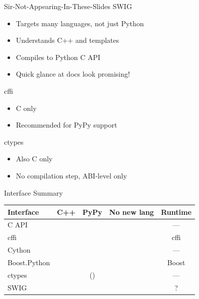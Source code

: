 \documentclass{beamer}
\begin{document}
\begin{frame}{Sir-Not-Appearing-In-These-Slides}
  SWIG
  \begin{itemize}
    \item Targets many languages, not just Python
    \item Understands C++ and templates
    \item Compiles to Python C API
    \item Quick glance at docs look promising!
  \end{itemize}
  cffi
  \begin{itemize}
    \item C only
    \item Recommended for PyPy support
  \end{itemize}
  ctypes
  \begin{itemize}
    \item Also C only
    \item No compilation step, ABI-level only
  \end{itemize}
\end{frame}

\begin{frame}{Interface Summary}
  \def\yes{\textcolor{green!50!black}{\CheckmarkBold}}
  \def\no{\textcolor{red}{\XSolidBrush}}
  \begin{table}
    \begin{tabular}{lcccc}
      \toprule
      Interface & C++ & PyPy & No new lang & Runtime\\
      \midrule
      C API & \no & \no & \yes & ---\\
      cffi  & \no & \yes & \yes & cffi\\
      Cython & \yes & \no & \no & ---\\
      Boost.Python & \yes & \no & \yes & Boost\\
      ctypes & \no & (\yes) & \yes & ---\\
      SWIG & \yes & \no & \no & ?\\
      \bottomrule
    \end{tabular}
  \end{table}
\end{frame}

\end{document}
